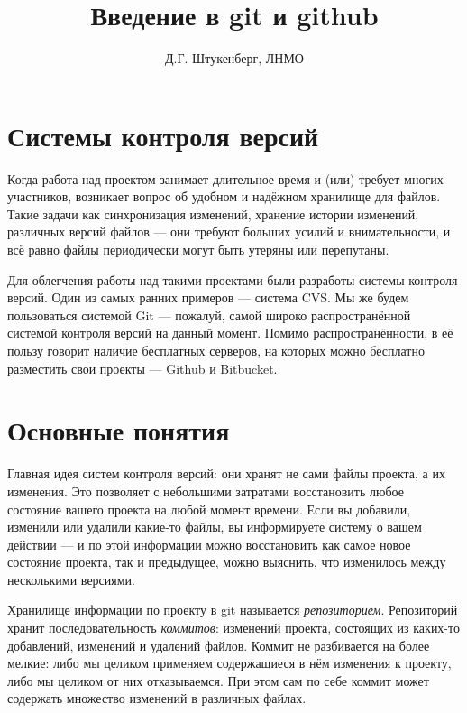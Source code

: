 \documentclass[12pt]{article}
\begin{document}
\theoremstyle{definition}
\newtheorem{definition}{Определение}[section]

\title{Введение в git и github}
\author{Д.Г. Штукенберг, ЛНМО}

\maketitle

\section{Системы контроля версий}

Когда работа над проектом занимает длительное время и (или) требует
многих участников, возникает вопрос об удобном и надёжном хранилище 
для файлов. Такие задачи как синхронизация изменений, хранение 
истории изменений, различных версий файлов --- они требуют больших
усилий и внимательности, и всё равно файлы периодически могут быть
утеряны или перепутаны. 

Для облегчения работы над такими проектами были разработы системы
контроля версий. Один из самых ранних примеров --- система CVS. 
Мы же будем пользоваться системой
Git --- пожалуй, самой широко распространённой системой контроля версий
на данный момент. Помимо распространённости, в её пользу говорит 
наличие бесплатных серверов, на которых можно бесплатно разместить свои
проекты --- Github и Bitbucket.

\section{Основные понятия}

Главная идея систем контроля версий: они хранят не сами файлы проекта,
а их изменения. Это позволяет с небольшими затратами восстановить любое
состояние вашего проекта на любой момент времени.
Если вы добавили, изменили или удалили какие-то файлы, вы информируете
систему о вашем действии --- и по этой информации можно восстановить
как самое новое состояние проекта, так и предыдущее, можно выяснить,
что изменилось между несколькими версиями.

Хранилище информации по проекту в git называется \emph{репозиторием}.
Репозиторий хранит последовательность \emph{коммитов}:
изменений проекта, состоящих из каких-то добавлений, изменений и 
удалений файлов. Коммит не разбивается на более мелкие: либо мы целиком 
применяем содержащиеся в нём изменения к проекту, либо мы целиком от 
них отказываемся. При этом сам по себе коммит может содержать множество
изменений в различных файлах.
\end{document}
